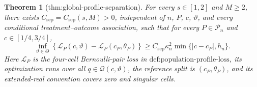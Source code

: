 \documentclass{article}
\newtheorem{theorem}{Theorem}
\begin{document}
\begin{theorem}[thm:global-profile-separation]\label{thm:global-profile-separation}
For every \(s\in[1,2]\) and \(M\ge2\), there exists \(C_{\mathrm{sep}}=C_{\mathrm{sep}}(s,M)>0\), independent of \(n\), \(P\), \(c\), \(\vartheta\), and every conditional treatment--outcome association, such that for every \(P\in\mathcal P_n\) and \(c\in[1/4,3/4]\), \[\inf_{\vartheta\in\Theta}\left\{\mathcal L_P(c,\vartheta)-\mathcal L_P(c_P,\theta_P)\right\}\ge C_{\mathrm{sep}}\kappa_n^2\min\{|c-c_P|,h_n\}.\] Here \(\mathcal L_P\) is the four-cell Bernoulli-pair loss in \(\text{def:population-profile-loss}\), its optimization runs over all \(q\in\mathcal Q(c,\vartheta)\), the reference split is \((c_P,\theta_P)\), and its extended-real convention covers zero and singular cells.
\end{theorem}
\end{document}
